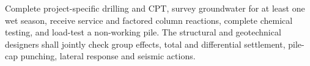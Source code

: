 \begin{keybox}
Complete project-specific drilling and CPT, survey groundwater for at least one wet season,
receive service and factored column reactions, complete chemical testing, and load-test a
non-working pile. The structural and geotechnical designers shall jointly check group effects,
total and differential settlement, pile-cap punching, lateral response and seismic actions.
\end{keybox}

\clearpage
{}

